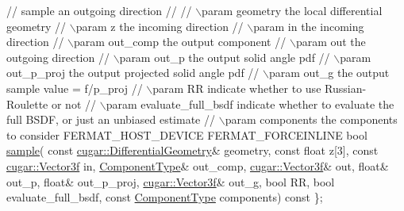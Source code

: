 \begin{DoxyParagraph}{}
\begin{DoxyCode}
   \textcolor{comment}{// sample an outgoing direction}
   \textcolor{comment}{//}
   \textcolor{comment}{// \(\backslash\)param geometry              the local differential geometry}
   \textcolor{comment}{// \(\backslash\)param z                     the incoming direction}
   \textcolor{comment}{// \(\backslash\)param in                    the incoming direction}
   \textcolor{comment}{// \(\backslash\)param out\_comp              the output component}
   \textcolor{comment}{// \(\backslash\)param out                   the outgoing direction}
   \textcolor{comment}{// \(\backslash\)param out\_p                 the output solid angle pdf}
   \textcolor{comment}{// \(\backslash\)param out\_p\_proj            the output projected solid angle pdf}
   \textcolor{comment}{// \(\backslash\)param out\_g                 the output sample value = f/p\_proj}
   \textcolor{comment}{// \(\backslash\)param RR                    indicate whether to use Russian-Roulette or not}
   \textcolor{comment}{// \(\backslash\)param evaluate\_full\_bsdf    indicate whether to evaluate the full BSDF, or just an unbiased estimate}
   \textcolor{comment}{// \(\backslash\)param components            the components to consider}
   FERMAT\_HOST\_DEVICE FERMAT\_FORCEINLINE
   \textcolor{keywordtype}{bool} \hyperlink{struct_bsdf_ac4ce2cad14795e1ff7f82ed10990ba3e}{sample}(
       \textcolor{keyword}{const} \hyperlink{structcugar_1_1_differential_geometry}{cugar::DifferentialGeometry}&  geometry,
       \textcolor{keyword}{const} \textcolor{keywordtype}{float}                         z[3],
       \textcolor{keyword}{const} \hyperlink{structcugar_1_1_vector}{cugar::Vector3f}               in,
       \hyperlink{struct_bsdf_a5f7db6f81220ed9ee6da109d6eb5b585}{ComponentType}&                      out\_comp,
       \hyperlink{structcugar_1_1_vector}{cugar::Vector3f}&                    out,
       \textcolor{keywordtype}{float}&                              out\_p,
       \textcolor{keywordtype}{float}&                              out\_p\_proj,
       \hyperlink{structcugar_1_1_vector}{cugar::Vector3f}&                    out\_g,
       \textcolor{keywordtype}{bool}                                RR,
       \textcolor{keywordtype}{bool}                                evaluate\_full\_bsdf,
       \textcolor{keyword}{const} \hyperlink{struct_bsdf_a5f7db6f81220ed9ee6da109d6eb5b585}{ComponentType}                 components) \textcolor{keyword}{const}
\};
\end{DoxyCode}
 
\end{DoxyParagraph}
